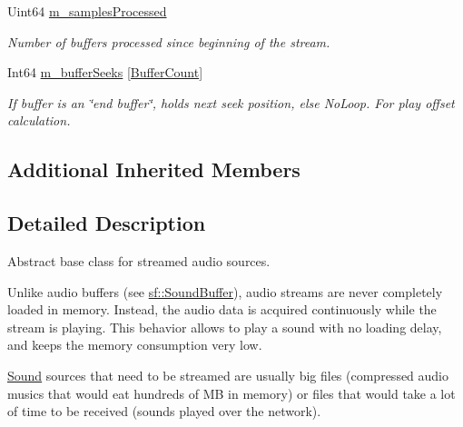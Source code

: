 \begin{DoxyCompactItemize}
\mbox{\label{classsf_1_1_sound_stream_a7365a2ec97b89cec15577b31461ff4be}} 
Uint64 \mbox{\hyperlink{classsf_1_1_sound_stream_a7365a2ec97b89cec15577b31461ff4be}{m\+\_\+samples\+Processed}}
\begin{DoxyCompactList}\small\item\em Number of buffers processed since beginning of the stream. \end{DoxyCompactList}\item 
\mbox{\label{classsf_1_1_sound_stream_aeab61fab14a1e1ac87f7a1c98d3cf73f}} 
Int64 \mbox{\hyperlink{classsf_1_1_sound_stream_aeab61fab14a1e1ac87f7a1c98d3cf73f}{m\+\_\+buffer\+Seeks}} \mbox{[}\mbox{\hyperlink{classsf_1_1_sound_stream_a2419ce94e45f7d4d0302b7963282c40ca3adf3b6cd18edb6121fda81e569dbbf5}{Buffer\+Count}}\mbox{]}
\begin{DoxyCompactList}\small\item\em If buffer is an \char`\"{}end buffer\char`\"{}, holds next seek position, else No\+Loop. For play offset calculation. \end{DoxyCompactList}\end{DoxyCompactItemize}
\subsection*{Additional Inherited Members}


\subsection{Detailed Description}
Abstract base class for streamed audio sources. 

\begin{DoxyVerb}\end{DoxyVerb}


Unlike audio buffers (see \mbox{\hyperlink{classsf_1_1_sound_buffer}{sf\+::\+Sound\+Buffer}}), audio streams are never completely loaded in memory. Instead, the audio data is acquired continuously while the stream is playing. This behavior allows to play a sound with no loading delay, and keeps the memory consumption very low.

\mbox{\hyperlink{classsf_1_1_sound}{Sound}} sources that need to be streamed are usually big files (compressed audio musics that would eat hundreds of MB in memory) or files that would take a lot of time to be received (sounds played over the network).

